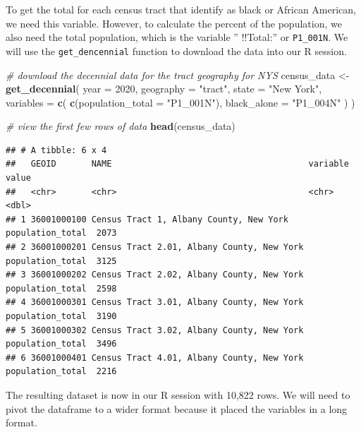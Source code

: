 \documentclass[
]{book}
\newenvironment{Shaded}{\begin{snugshade}}{\end{snugshade}}
\newcommand{\AttributeTok}[1]{\textcolor[rgb]{0.13,0.29,0.53}{#1}}
\newcommand{\CommentTok}[1]{\textcolor[rgb]{0.56,0.35,0.01}{\textit{#1}}}
\newcommand{\DecValTok}[1]{\textcolor[rgb]{0.00,0.00,0.81}{#1}}
\newcommand{\FunctionTok}[1]{\textcolor[rgb]{0.13,0.29,0.53}{\textbf{#1}}}
\newcommand{\NormalTok}[1]{#1}
\newcommand{\OtherTok}[1]{\textcolor[rgb]{0.56,0.35,0.01}{#1}}
\newcommand{\StringTok}[1]{\textcolor[rgb]{0.31,0.60,0.02}{#1}}
\begin{document}
To get the total for each census tract that identify as black or African American, we need this variable. However, to calculate the percent of the population, we also need the total population, which is the variable '' !!Total:'' or \texttt{P1\_001N}. We will use the \texttt{get\_dencennial} function to download the data into our R session.

\begin{Shaded}
\begin{Highlighting}[]
\CommentTok{\# download the decennial data for the tract geography for NYS}
\NormalTok{census\_data }\OtherTok{\textless{}{-}} \FunctionTok{get\_decennial}\NormalTok{(}
  \AttributeTok{year =} \DecValTok{2020}\NormalTok{,}
  \AttributeTok{geography =} \StringTok{"tract"}\NormalTok{,}
  \AttributeTok{state =} \StringTok{"New York"}\NormalTok{,}
  \AttributeTok{variables =} \FunctionTok{c}\NormalTok{(}
    \FunctionTok{c}\NormalTok{(}\AttributeTok{population\_total =} \StringTok{"P1\_001N"}\NormalTok{),}
    \AttributeTok{black\_alone =} \StringTok{"P1\_004N"}
\NormalTok{  )}
\NormalTok{)}
\end{Highlighting}
\end{Shaded}

\begin{Shaded}
\begin{Highlighting}[]
\CommentTok{\# view the first few rows of data}
\FunctionTok{head}\NormalTok{(census\_data)}
\end{Highlighting}
\end{Shaded}

\begin{verbatim}
## # A tibble: 6 x 4
##   GEOID       NAME                                       variable         value
##   <chr>       <chr>                                      <chr>            <dbl>
## 1 36001000100 Census Tract 1, Albany County, New York    population_total  2073
## 2 36001000201 Census Tract 2.01, Albany County, New York population_total  3125
## 3 36001000202 Census Tract 2.02, Albany County, New York population_total  2598
## 4 36001000301 Census Tract 3.01, Albany County, New York population_total  3190
## 5 36001000302 Census Tract 3.02, Albany County, New York population_total  3496
## 6 36001000401 Census Tract 4.01, Albany County, New York population_total  2216
\end{verbatim}

The resulting dataset is now in our R session with 10,822 rows. We will need to pivot the dataframe to a wider format because it placed the variables in a long format.
\end{document}
